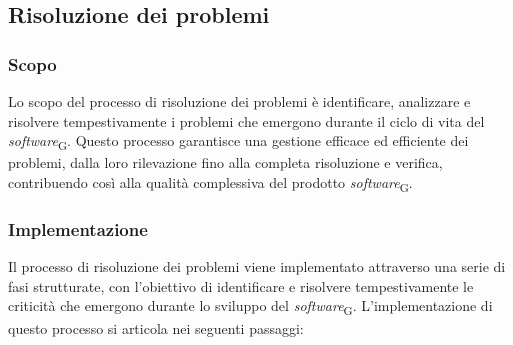 \subsection{Risoluzione dei problemi}
\subsubsection{Scopo}
Lo scopo del processo di risoluzione dei problemi è identificare, analizzare e risolvere tempestivamente i problemi che emergono durante il ciclo di vita del \textit{software}\textsubscript{G}. Questo processo garantisce una gestione efficace ed efficiente dei problemi, dalla loro rilevazione fino alla completa risoluzione e verifica, contribuendo così alla qualità complessiva del prodotto \textit{software}\textsubscript{G}.

\subsubsection{Implementazione}
Il processo di risoluzione dei problemi viene implementato attraverso una serie di fasi strutturate, con l’obiettivo di identificare e risolvere tempestivamente le criticità che emergono durante lo sviluppo del \textit{software}\textsubscript{G}. L’implementazione di questo processo si articola nei seguenti passaggi:
